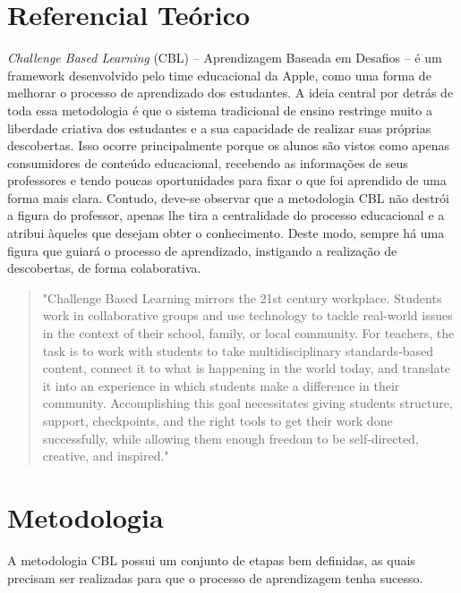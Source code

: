 \documentclass[
	12pt,				%
	openright,			%
	twoside,			%
	a4paper,			%
	english,			%
	french,				%
	spanish,			%
	brazil,				%
	]{abntex2}
\begin{document}
\section{Referencial Teórico}

\textit{Challenge Based Learning} (CBL) -- Aprendizagem Baseada em Desafios -- é um framework desenvolvido pelo time educacional da Apple, como uma forma de melhorar o processo de aprendizado dos estudantes. A ideia central por detrás de toda essa metodologia é que o sistema tradicional de ensino restringe muito a liberdade criativa dos estudantes e a sua capacidade de realizar suas próprias descobertas. Isso ocorre principalmente porque os alunos são vistos como apenas consumidores de conteúdo educacional, recebendo as informações de seus professores e tendo poucas oportunidades para fixar o que foi aprendido de uma forma mais clara. Contudo, deve-se observar que a metodologia CBL não destrói a figura do professor, apenas lhe tira a centralidade do processo educacional e a atribui àqueles que desejam obter o conhecimento. Deste modo, sempre há uma figura que guiará o processo de aprendizado, instigando a realização de descobertas, de forma colaborativa.

\begin{quote}
"Challenge Based Learning mirrors the 21st century workplace. Students work in collaborative groups and use technology to tackle real-world issues in the context of
their school, family, or local community. For teachers, the task is to work with students to take multidisciplinary standards-based content, connect it to what is happening in the world today, and translate it into an experience in which students make a difference in their community. Accomplishing this goal necessitates giving students structure, support, checkpoints, and the right tools to get their work done successfully, while allowing them enough freedom to be self-directed, creative, and inspired."

\cite{cbl_methodology}

\end{quote}
\section{Metodologia}

A metodologia CBL possui um conjunto de etapas bem definidas, as quais precisam ser realizadas para que o processo de aprendizagem tenha sucesso. 
\end{document}

